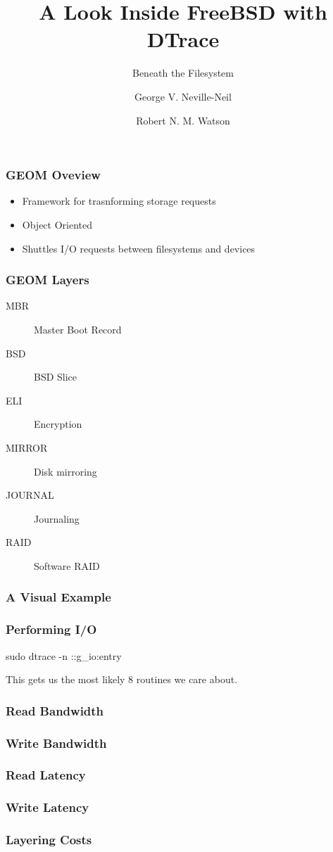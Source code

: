 \documentclass[pdftex]{beamer}
\begin{document}

\title{A Look Inside FreeBSD with DTrace}
\subtitle{Beneath the Filesystem}
\author[shortname]{George V. Neville-Neil \and Robert N. M. Watson}

\begin{frame}
  \frametitle{GEOM Oveview}
  \begin{itemize}
  \item Framework for trasnforming storage requests
  \item Object Oriented
  \item Shuttles I/O requests between filesystems and devices
  \end{itemize}
\end{frame}

\begin{frame}
  \frametitle{GEOM Layers}
  \begin{description}
  \item[MBR] Master Boot Record
  \item[BSD] BSD Slice
  \item[ELI] Encryption
  \item[MIRROR] Disk mirroring
  \item[JOURNAL] Journaling
  \item[RAID] Software RAID
\end{description}
\end{frame}

\begin{frame}
  \frametitle{A Visual Example}
  
\end{frame}

\begin{frame}
  \frametitle{Performing I/O}
sudo dtrace -n ::g_io\*:entry  

This gets us the most likely 8 routines we care about.

\end{frame}

\begin{frame}
  \frametitle{Read Bandwidth}
  
\end{frame}

\begin{frame}
  \frametitle{Write Bandwidth}
  
\end{frame}

\begin{frame}
  \frametitle{Read Latency}
  
\end{frame}

\begin{frame}
  \frametitle{Write Latency}
  
\end{frame}

\begin{frame}
  \frametitle{Layering Costs}
  
\end{frame}

\end{document}
